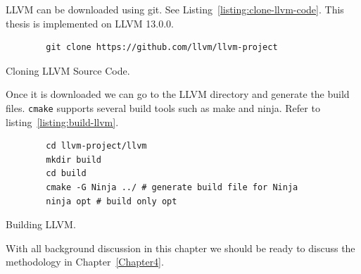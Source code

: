 LLVM can be downloaded using git. See Listing~\ref{listing:clone-llvm-code}.
This thesis is implemented on LLVM 13.0.0.

\begin{listing}[htbp]
    \begin{verbatim}
        git clone https://github.com/llvm/llvm-project
    \end{verbatim}
    \caption{Cloning LLVM Source Code.}    
    \label{listing:clone-llvm-code}
\end{listing}

Once it is downloaded we can go to the LLVM directory and generate the build
files. \texttt{cmake} supports several build tools such as make and ninja. Refer
to listing~\ref{listing:build-llvm}.

\begin{listing}[htbp]
    \begin{verbatim}
        cd llvm-project/llvm
        mkdir build
        cd build
        cmake -G Ninja ../ # generate build file for Ninja
        ninja opt # build only opt
    \end{verbatim}
    \caption{Building LLVM.}    
    \label{listing:build-llvm}
\end{listing}

With all background discussion in this chapter we should be ready to discuss the
methodology in Chapter~\ref{Chapter4}.